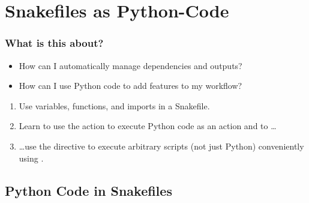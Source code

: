 \section{Snakefiles as Python-Code}
{   
}

\begin{frame}
  \frametitle{What is this about?}
   \begin{question}[Questions]
   	 \begin{itemize}
        \item How can I automatically manage dependencies and outputs?
        \item How can I use Python code to add features to my workflow?
     \end{itemize}
   \end{question}
   \begin{docs}[Objectives]
   	  \begin{enumerate}
         \item Use variables, functions, and imports in a Snakefile. 
         \item Learn to use the  action to execute Python code as an action and to \ldots
         \item \ldots use the  directive to execute arbitrary scripts (not just Python) conveniently using \Snakemake.
       \end{enumerate}
   \end{docs}
\end{frame}

\subsection{Python Code in Snakefiles}

